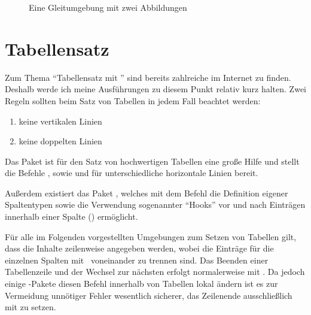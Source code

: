 \documentclass[%
  english,ngerman,%
  cdgeometry=no,DIV=12,automark,%
]{tudscrartcl}
\begin{document}
\begin{Trunk}
\begin{figure}
%
  {\caption{Eine Gleitumgebung mit zwei Abbildungen}\label{fig:logos}}%
\end{figure}

\end{Trunk}
\InputCode



\section{Tabellensatz}
\label{sec:tables}
Zum Thema \enquote{Tabellensatz mit } sind bereits zahlreiche 
\cite{reichert2012} im Internet zu finden. Deshalb werde ich meine Ausführungen 
zu diesem Punkt relativ kurz halten. Zwei Regeln sollten beim Satz von Tabellen 
in jedem Fall beachtet werden:
%
\begin{enumerate}[itemindent=0pt,labelwidth=*,labelsep=1em,label=\Roman*.,noitemsep]
\item keine vertikalen Linien
\item keine doppelten Linien
\end{enumerate}
%
Das Paket  ist für den Satz von hochwertigen Tabellen eine 
große Hilfe und stellt die Befehle ,  sowie
 und  für unterschiedliche horizontale Linien 
bereit.
%
\begin{Preamble}
\usepackage{booktabs}
\end{Preamble}
%
Außerdem existiert das Paket , welches mit dem Befehl 
 die Definition eigener Spaltentypen sowie die Verwendung 
sogenannter \enquote{Hooks} vor und nach Einträgen innerhalb einer Spalte 
(\PValue{>\PParameter{\dots}}\PValue{<\PParameter{\dots}}) 
ermöglicht.
%
\begin{Preamble}
\usepackage{array}
\end{Preamble}
%
Für alle im Folgenden vorgestellten Umgebungen zum Setzen von Tabellen gilt, 
dass die Inhalte zeilenweise angegeben werden, wobei die Einträge für die 
einzelnen Spalten mit~\PValue{\&} voneinander zu trennen sind. Das Beenden 
einer Tabellenzeile und der Wechsel zur nächsten erfolgt normalerweise mit 
\PValue{\textbackslash\textbackslash}. Da jedoch einige -Pakete 
diesen Befehl innerhalb von Tabellen lokal ändern ist es zur Vermeidung 
unnötiger Fehler wesentlich sicherer, das Zeilenende ausschließlich mit 
 zu setzen.
\end{document}
